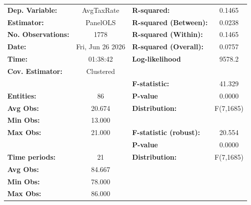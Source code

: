 \begin{center}
\begin{tabular}{lclc}
\toprule
\textbf{Dep. Variable:}                       &     AvgTaxRate     & \textbf{  R-squared:         }   &      0.1465      \\
\textbf{Estimator:}                           &      PanelOLS      & \textbf{  R-squared (Between):}  &      0.0238      \\
\textbf{No. Observations:}                    &        1778        & \textbf{  R-squared (Within):}   &      0.1465      \\
\textbf{Date:}                                &  Fri, Jun 26 2026  & \textbf{  R-squared (Overall):}  &      0.0757      \\
\textbf{Time:}                                &      01:38:42      & \textbf{  Log-likelihood     }   &      9578.2      \\
\textbf{Cov. Estimator:}                      &     Clustered      & \textbf{                     }   &                  \\
\textbf{}                                     &                    & \textbf{  F-statistic:       }   &      41.329      \\
\textbf{Entities:}                            &         86         & \textbf{  P-value            }   &      0.0000      \\
\textbf{Avg Obs:}                             &       20.674       & \textbf{  Distribution:      }   &    F(7,1685)     \\
\textbf{Min Obs:}                             &       13.000       & \textbf{                     }   &                  \\
\textbf{Max Obs:}                             &       21.000       & \textbf{  F-statistic (robust):} &      20.554      \\
\textbf{}                                     &                    & \textbf{  P-value            }   &      0.0000      \\
\textbf{Time periods:}                        &         21         & \textbf{  Distribution:      }   &    F(7,1685)     \\
\textbf{Avg Obs:}                             &       84.667       & \textbf{                     }   &                  \\
\textbf{Min Obs:}                             &       78.000       & \textbf{                     }   &                  \\
\textbf{Max Obs:}                             &       86.000       & \textbf{                     }   &                  \\

\end{tabular}
\end{center}
